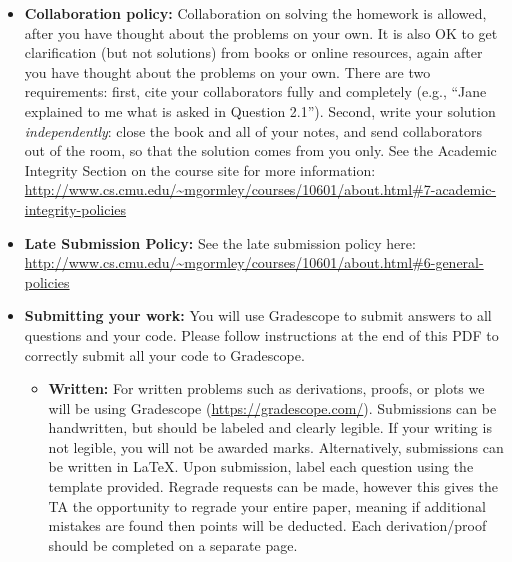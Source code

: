 \documentclass[11pt]{article}
\numberwithin{equation}{section} %
\numberwithin{figure}{section} %
\numberwithin{table}{section} %
\begin{document}
\begin{itemize}

\item \textbf{Collaboration policy:} Collaboration on solving the homework is allowed, after you have thought about the problems on your own. It is also OK to get clarification (but not solutions) from books or online resources, again after you have thought about the problems on your own. There are two requirements: first, cite your collaborators fully and completely (e.g., ``Jane explained to me what is asked in Question 2.1''). Second, write your solution {\em independently}: close the book and all of your notes, and send collaborators out of the room, so that the solution comes from you only.  See the Academic Integrity Section on the course site for more information: \url{http://www.cs.cmu.edu/~mgormley/courses/10601/about.html#7-academic-integrity-policies}

\item\textbf{Late Submission Policy:} See the late submission policy here: \url{http://www.cs.cmu.edu/~mgormley/courses/10601/about.html#6-general-policies}

\item\textbf{Submitting your work:} You will use Gradescope to submit
  answers to all questions and your code. Please
  follow instructions at the end of this PDF to correctly submit all your code to Gradescope.

  \begin{itemize}
    

    
   \item \textbf{Written:} For written problems such as derivations,
       proofs, or plots we will be using Gradescope
       (\url{https://gradescope.com/}). Submissions can be handwritten, but
       should be labeled and clearly legible. If your writing is not
       legible, you will not be awarded marks. Alternatively, submissions
       can be written in LaTeX. Upon submission, label each question
       using the template provided. Regrade requests can be made, however
       this gives the TA the opportunity to regrade your entire paper,
       meaning if additional mistakes are found then points will be
       deducted.
       Each derivation/proof should be  completed on a separate page.


\end{itemize}
\end{itemize}
\end{document}
